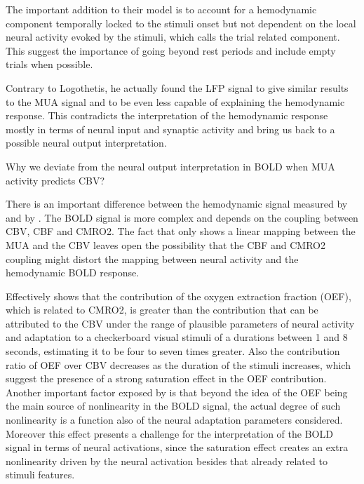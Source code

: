 
The important addition to their model is to account for a hemodynamic component temporally locked to the stimuli onset but not dependent on the local neural activity evoked by the stimuli, which \citep{cardoso_neuroimaging_2012} calls the trial related component. This suggest the importance of going beyond rest periods and include empty trials when possible.

Contrary to Logothetis, he actually found the LFP signal to give similar results to the MUA signal and to be even less capable of explaining the hemodynamic response. This contradicts the interpretation of the hemodynamic response mostly in terms of neural input and synaptic activity and bring us back to a possible neural output interpretation.

 Why we deviate from the neural output interpretation in BOLD when MUA activity predicts CBV?

There is an important difference between the hemodynamic signal measured by \citep{logothetis_neurophysiological_2001} and by \citep{cardoso_neuroimaging_2012}. The BOLD signal is more complex and depends on the coupling between CBV, CBF and CMRO2. The fact that \citep{cardoso_neuroimaging_2012} only shows a linear mapping between the MUA and the CBV leaves open the possibility that the CBF and CMRO2 coupling might distort the mapping between neural activity and the hemodynamic BOLD response.

Effectively \citep{toyoda_source_2008} shows that the contribution of the oxygen extraction fraction (OEF), which is related to CMRO2, is greater than the contribution that can be attributed to the CBV under the range of plausible parameters of neural activity and adaptation to a checkerboard visual stimuli of a durations between 1 and 8 seconds, estimating it to be four to seven times greater. Also the contribution ratio of OEF over CBV decreases as the duration of the stimuli increases, which suggest the presence of a strong saturation effect in the OEF contribution. Another important factor exposed by \citep{toyoda_source_2008} is that beyond the idea of the OEF being the main source of nonlinearity in the BOLD signal, the actual degree of such nonlinearity is a function also of the neural adaptation parameters considered. Moreover this effect presents a challenge for the interpretation of the BOLD signal in terms of neural activations, since the saturation effect creates an extra nonlinearity driven by the neural activation besides that already related to stimuli features.

